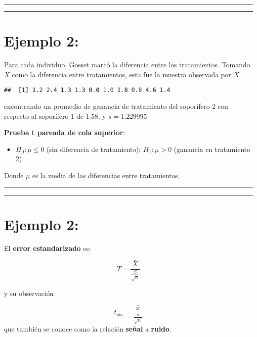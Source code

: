 \documentclass[
]{book}
\providecommand{\tightlist}{%
  \setlength{\itemsep}{0pt}\setlength{\parskip}{0pt}}
\begin{document}
\begin{center}\rule{0.5\linewidth}{0.5pt}\end{center}

\begin{center}\rule{0.5\linewidth}{0.5pt}\end{center}

\hypertarget{ejemplo-2-4}{%
\section{Ejemplo 2:}\label{ejemplo-2-4}}

Para cada individuo, Gosset marcó la diferencia entre los tratamientos. Tomando \(X\) como la diferencia entre tratamientos, esta fue la muestra observada por \(X\)

\begin{verbatim}
##  [1] 1.2 2.4 1.3 1.3 0.0 1.0 1.8 0.8 4.6 1.4
\end{verbatim}

encontrando un promedio de ganancia de tratamiento del soporífero 2 con respecto al soporífero 1 de \(1.58\), y \(s=1.229995\)

\textbf{Prueba t pareada de cola superior}:

\begin{itemize}
\tightlist
\item
  \(H_0:\mu \leq 0\) (sin diferencia de tratamiento); \(H_1:\mu > 0\) (ganancia en tratamiento 2)
\end{itemize}

Donde \(\mu\) es la media de las diferencias entre tratamientos.

\begin{center}\rule{0.5\linewidth}{0.5pt}\end{center}

\begin{center}\rule{0.5\linewidth}{0.5pt}\end{center}

\hypertarget{ejemplo-2-5}{%
\section{Ejemplo 2:}\label{ejemplo-2-5}}

El \textbf{error estandarizado} es:

\[T=\frac{\bar{X}}{\frac{S}{\sqrt{n}}}\]

y su observación

\[t_{obs}=\frac{\bar{x}}{\frac{s}{\sqrt{n}}}\]
que también se conoce como la relación \textbf{señal} a \textbf{ruido}.
\end{document}
